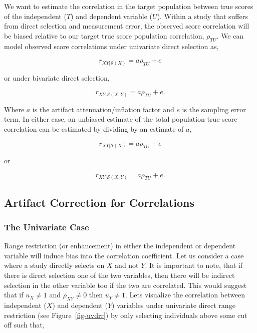 \documentclass[
  letterpaper,
  DIV=11,
  numbers=noendperiod]{scrreprt}
\begin{document}
We want to estimate the correlation in the target population between
true scores of the independent (\(T\)) and dependent variable (\(U\)).
Within a study that suffers from direct selection and measurement error,
the observed score correlation will be biased relative to our target
true score population correlation, \(\rho_{TU}\). We can model observed
score correlations under univariate direct selection as,

\[
r_{XY|\mathcal{S}(X)} = a \rho_{TU} + e
\]

or under bivariate direct selection,

\[
r_{XY|\mathcal{S}(X,Y)} = a \rho_{TU} + e.
\]

Where \(a\) is the artifact attenuation/inflation factor and \(e\) is
the sampling error term. In either case, an unbiased estimate of the
total population true score correlation can be estimated by dividing by
an estimate of \(a\),

\[
r_{XY|\mathcal{S}(X)} = a \rho_{TU} + e
\]

or

\[
r_{XY|\mathcal{S}(X,Y)} = a \rho_{TU} + e.
\]

\hypertarget{sec-corr-DDR}{%
\subsection{Artifact Correction for Correlations}\label{sec-corr-DDR}}

\hypertarget{the-univariate-case-1}{%
\subsubsection*{The Univariate Case}\label{the-univariate-case-1}}

Range restriction (or enhancement) in either the independent or
dependent variable will induce bias into the correlation coefficient.
Let us consider a case where a study directly selects on \(X\) and not
\(Y\). It is important to note, that if there is direct selection one of
the two variables, then there will be indirect selection in the other
variable too if the two are correlated. This would suggest that if
\(u_X\neq 1\) and \(\rho_{XY}\neq 0\) then \(u_Y\neq 1\). Lets visualize
the correlation between independent (\(X\)) and dependent (\(Y\))
variables under univariate direct range restriction (see
Figure~\ref{fig-uvdrr}) by only selecting individuals above some cut off
such that,
\end{document}
